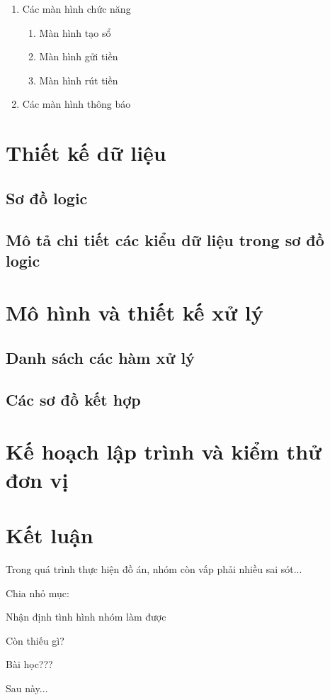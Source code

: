 \documentclass{article}
\begin{document}
\begin{enumerate}
\begin{itemize}
				\end{itemize}
			

			\newpage
			
			\item Các màn hình chức năng
			
				\begin{enumerate}
					\item Màn hình tạo sổ
					\item Màn hình gửi tiền
					\item Màn hình rút tiền
					
				\end{enumerate}
			
			\item Các màn hình thông báo
		\end{enumerate}
	
	
	\section{Thiết kế dữ liệu}
	\subsection{Sơ đồ logic}
	\subsection{Mô tả chi tiết các kiểu dữ liệu trong sơ đồ logic}
	
	\section{Mô hình và thiết kế xử lý}
	\subsection{Danh sách các hàm xử lý}
	\subsection{Các sơ đồ kết hợp}
	
	\section{Kế hoạch lập trình và kiểm thử đơn vị}
	
	\section{Kết luận}
	
	Trong quá trình thực hiện đồ án, nhóm còn vấp phải nhiều sai sót...
	
	
	Chia nhỏ mục:
	
	Nhận định tình hình nhóm làm được
	
	Còn thiếu gì?
	
	Bài học???
	
	Sau này...
	
\end{document}
